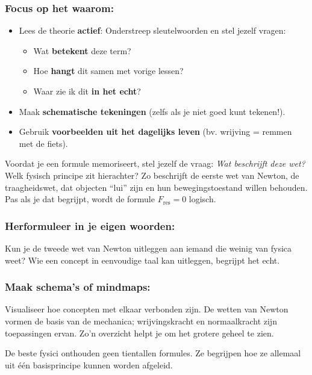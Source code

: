 \documentclass{ximera}
\begin{document}
\subsubsection{Focus op het waarom:}  
\begin{itemize}
    \item Lees de theorie \textbf{actief}: Onderstreep sleutelwoorden en stel jezelf vragen:
    \begin{itemize}
        \item Wat \textbf{betekent} deze term?
        \item Hoe \textbf{hangt} dit samen met vorige lessen?
        \item Waar zie ik dit \textbf{in het echt}?
    \end{itemize}
    \item Maak \textbf{schematische tekeningen} (zelfs als je niet goed kunt tekenen!).
    \item Gebruik \textbf{voorbeelden uit het dagelijks leven} (bv. wrijving = remmen met de fiets).
\end{itemize}
Voordat je een formule memoriseert, stel jezelf de vraag: \textit{Wat beschrijft deze wet?}  
Welk fysisch principe zit hierachter?  
Zo beschrijft de eerste wet van Newton, de traagheidswet, dat objecten “lui” zijn en hun bewegingstoestand willen behouden.  
Pas als je dat begrijpt, wordt de formule $F_{\text{res}} = 0$ logisch.


\subsubsection*{Herformuleer in je eigen woorden:}
Kun je de tweede wet van Newton uitleggen aan iemand die weinig van fysica weet?  
Wie een concept in eenvoudige taal kan uitleggen, begrijpt het echt.

\subsubsection*{Maak schema’s of mindmaps:}
Visualiseer hoe concepten met elkaar verbonden zijn.  
De wetten van Newton vormen de basis van de mechanica; wrijvingskracht en normaalkracht zijn toepassingen ervan.  
Zo’n overzicht helpt je om het grotere geheel te zien.

\begin{remark}
De beste fysici onthouden geen tientallen formules. Ze begrijpen hoe ze allemaal uit één basisprincipe kunnen worden afgeleid.
\end{remark}
\end{document}
